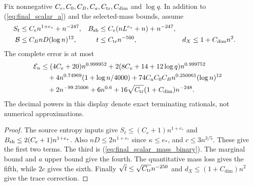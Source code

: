 \begin{lemma}
    \label{thm:arealaw-final-sharp-envelope}
    \leanok
    Fix nonnegative $C_e,C_0,C_B,C_a,C_{\rm tr},C_{\dim}$
    and $\log q$. In addition to (\ref{eq:final_scalar_a}) and
    the selected-mass bounds, assume
    \begin{align}
        S_t        & \leq C_e n^{1+e_*}+n^{-247},          &
        B_{\rm sh} & \leq C_e(nL^{e_*}+n)+n^{-247}, \notag   \\
        \mathcal B & \leq C_B nD(\log n)^{12},             &
        t          & \leq C_{\rm tr}n^{-500},              &
        d_X        & \leq1+C_{\dim}n^2.
        \label{eq:final_scalar_inputs}
    \end{align}
    The complete error is at most
    \begin{align}
        \mathcal E_n
         & \leq(4C_e+20)n^{0.999952}
        +2(8C_e+14+12\log q)n^{0.999752} \notag       \\
         & \quad+4n^{0.74969}(1+\log n/4000)
        +74C_aC_0C_B n^{0.250061}(\log n)^{12} \notag \\
         & \quad+2n^{-99.25006}+6n^{0.6}
        +16\sqrt{C_{\rm tr}}(1+C_{\dim})n^{-248}.
        \label{eq:final_scalar_envelope}
    \end{align}
    The decimal powers in this display denote exact terminating
    rationals, not numerical approximations.
\end{lemma}

\begin{proof}
    \leanok
    The source entropy inputs give
    $S_t\leq(C_e+1)n^{1+e_*}$ and
    $B_{\rm sh}\leq2(C_e+1)n^{1+e_*}$.
    Also $nD\leq2n^{1+e_*}$ since $\kappa\leq e_*$, and
    $c\leq3n^{3/5}$. These give the first two terms.
    The third is (\ref{eq:final_scalar_mass_binary}).
    The marginal bound and $a$ upper bound give the fourth.
    The quantitative mass loss gives the fifth, while $2c$
    gives the sixth. Finally $\sqrt t\leq\sqrt{C_{\rm tr}}n^{-250}$
    and $d_X\leq(1+C_{\dim})n^2$ give the trace correction.
\end{proof}

